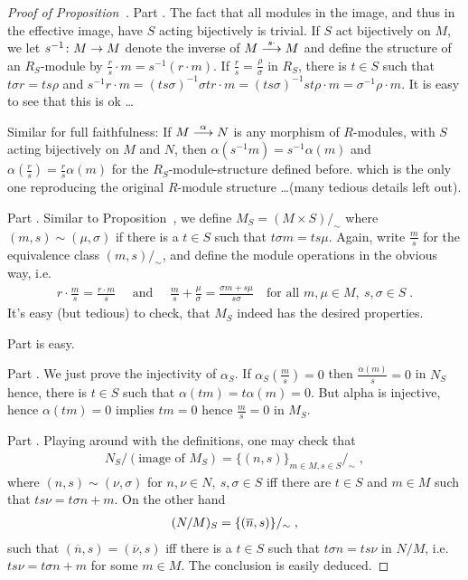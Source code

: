 \documentclass[a4paper,parskip=half,numbers=enddot, DIV=12]{scrreprt}
\begin{document}
	\begin{proof}[Proof of Proposition~]
		Part . The fact that all modules in the image, and thus in the effective image, have $S$ acting bijectively is trivial. If $S$ act bijectively on $M$, we let $s^{-1}\colon M\morphism M$ denote the inverse of $M\morphism[s\cdot]M$ and define the structure of an $R_S$-module by $\frac{r}{s}\cdot m = s^{-1} (r\cdot m)$. If $\frac{r}{s}=\frac{\rho}{\sigma}$ in $R_S$, there is $t\in S$ such that $t\sigma r = ts\rho$ and $s^{-1} r\cdot m = (ts\sigma)^{-1} \sigma t r \cdot m = (ts\sigma)^{-1} s t \rho \cdot m = \sigma^{-1} \rho \cdot m $. It is easy to see that this is ok \ldots
		
		Similar for full faithfulness: If $M\morphism[\alpha] N$ is any morphism of $R$-modules, with $S$ acting bijectively on $M$ and $N$, then $\alpha(s^{-1} m) = s^{-1}\alpha(m)$ and $\alpha(\frac{r}{s}) = \frac{r}{s}\alpha(m)$ for the $R_S$-module-structure defined before. which is the only one reproducing the original $R$-module structure \ldots (many tedious details left out).
		
		Part . Similar to Proposition~, we define $M_S = (M\times S)/_\sim$ where $(m,s) \sim (\mu,\sigma) $ if there is a $t\in S$ such that $t\sigma m = ts\mu$. Again, write $\frac ms$ for the equivalence class $(m,s)/_\sim$, and  define the module operations in the obvious way, i.e.
		\begin{align*}
			r\cdot \frac{m}{s} = \frac{r\cdot m}{s}\quad\text{ and }\quad\frac{m}{s}+\frac{\mu}{\sigma} = \frac{\sigma m +s\mu}{s\sigma}\quad\text{for all }m,\mu\in M,\ s,\sigma\in S\;.
		\end{align*}
		It's easy (but tedious) to check, that $M_S$ indeed has the desired properties.
		
		Part  is easy.
		
		Part . We just prove the injectivity of $\alpha_S$. If $\alpha_S(\frac{m}{s})=0$ then $\frac{\alpha(m)}{s} = 0$ in $N_S$ hence, there is $t\in S$ such that $\alpha(tm) = t\alpha(m) = 0$. But alpha is injective, hence $\alpha(tm)= 0$ implies $tm=0$ hence $\frac{m}{s}=0$ in $M_S$.
		
		Part . Playing around with the definitions, one may check that
		\begin{align*}
			N_S/(\text{image of }M_S) = \{(n,s)\}_{m\in M,s\in S}/_\sim\;,
		\end{align*}
		  where $(n,s)\sim(\nu,\sigma)$ for $n,\nu\in N,\ s,\sigma\in S$ iff there are $t\in S$ and $m\in M$ such that $ts\nu = t\sigma n+m$. On the other hand
		  \begin{align*}
		  	(N/M)_S= \{(\overline{n},s)\}/_\sim\;,
		  \end{align*}
		  such that $(\overline{n}, s)= (\overline{\nu},s)$ iff there is a $t\in S$ such that $t\sigma n = ts\nu$ in $N/M$, i.e. $ts\nu=t\sigma n+m$ for some $m\in M$. The conclusion is easily deduced.
	\end{proof}
\end{document}
